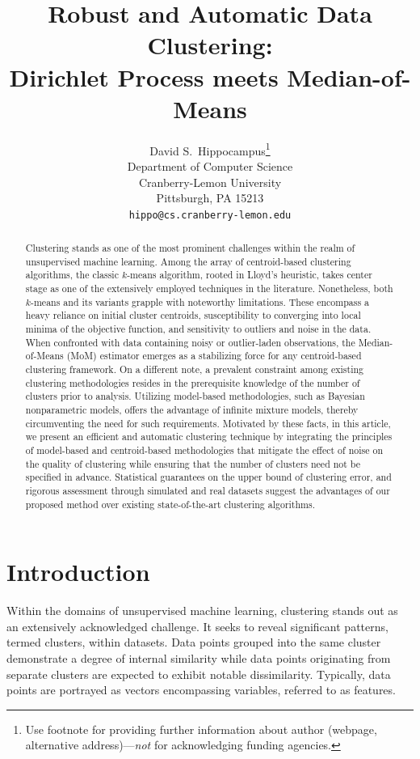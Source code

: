 \documentclass{article}
\title{Robust and Automatic Data Clustering:\\ Dirichlet Process meets Median-of-Means}
\author{%
  David S.~Hippocampus\thanks{Use footnote for providing further information
    about author (webpage, alternative address)---\emph{not} for acknowledging
    funding agencies.} \\
  Department of Computer Science\\
  Cranberry-Lemon University\\
  Pittsburgh, PA 15213 \\
  \texttt{hippo@cs.cranberry-lemon.edu} \\
}
\begin{document}
\maketitle


\begin{abstract}
  Clustering stands as one of the most prominent challenges within the realm of unsupervised machine learning. Among the array of centroid-based clustering algorithms, the classic $k$-means algorithm, rooted in Lloyd's heuristic, takes center stage as one of the extensively employed techniques in the literature. Nonetheless, both $k$-means and its variants grapple with noteworthy limitations. These encompass a heavy reliance on initial cluster centroids, susceptibility to converging into local minima of the objective function, and sensitivity to outliers and noise in the data. When confronted with data containing noisy or outlier-laden observations, the Median-of-Means (MoM) estimator emerges as a stabilizing force for any centroid-based clustering framework. On a different note, a prevalent constraint among existing clustering methodologies resides in the prerequisite knowledge of the number of clusters prior to analysis. Utilizing model-based methodologies, such as Bayesian nonparametric models, offers the advantage of infinite mixture models, thereby circumventing the need for such requirements. Motivated by these facts, in this article, we present an efficient and automatic clustering technique by integrating the principles of model-based and centroid-based methodologies that mitigate the effect of noise on the quality of clustering while ensuring that the number of clusters need not be specified in advance. Statistical guarantees on the upper bound of clustering error, and rigorous assessment through simulated and real datasets suggest the advantages of our proposed method over existing state-of-the-art clustering algorithms.
\end{abstract}


\section{Introduction}
\label{sec:intro}

Within the domains of unsupervised machine learning, clustering stands out as an extensively acknowledged challenge. It seeks to reveal significant patterns, termed clusters, within datasets. Data points grouped into the same cluster demonstrate a degree of internal similarity \citep{Xu2015} while data points originating from separate clusters are expected to exhibit notable dissimilarity. Typically, data points are portrayed as vectors encompassing variables, referred to as features.
\end{document}
